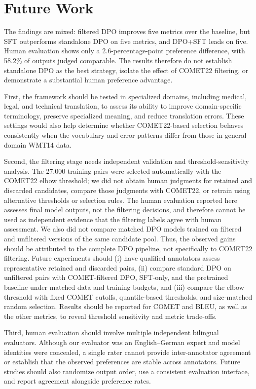 \documentclass[conference]{IEEEtran}
\begin{document}
\section{Future Work}\label{sec:future}
The findings are mixed: filtered DPO improves five metrics over the baseline, but SFT outperforms standalone DPO on five metrics, and DPO+SFT leads on five. Human evaluation shows only a 2.6-percentage-point preference difference, with 58.2\% of outputs judged comparable. The results therefore do not establish standalone DPO as the best strategy, isolate the effect of COMET22 filtering, or demonstrate a substantial human preference advantage.

First, the framework should be tested in specialized domains, including medical, legal, and technical translation, to assess its ability to improve domain-specific terminology, preserve specialized meaning, and reduce translation errors. These settings would also help determine whether COMET22-based selection behaves consistently when the vocabulary and error patterns differ from those in general-domain WMT14 data.

Second, the filtering stage needs independent validation and threshold-sensitivity analysis. The 27,000 training pairs were selected automatically with the COMET22 elbow threshold; we did not obtain human judgments for retained and discarded candidates, compare those judgments with COMET22, or retrain using alternative thresholds or selection rules. The human evaluation reported here assesses final model outputs, not the filtering decisions, and therefore cannot be used as independent evidence that the filtering labels agree with human assessment. We also did not compare matched DPO models trained on filtered and unfiltered versions of the same candidate pool. Thus, the observed gains should be attributed to the complete DPO pipeline, not specifically to COMET22 filtering. Future experiments should (i) have qualified annotators assess representative retained and discarded pairs, (ii) compare standard DPO on unfiltered pairs with COMET-filtered DPO, SFT-only, and the pretrained baseline under matched data and training budgets, and (iii) compare the elbow threshold with fixed COMET cutoffs, quantile-based thresholds, and size-matched random selection. Results should be reported for COMET and BLEU, as well as the other metrics, to reveal threshold sensitivity and metric trade-offs.

Third, human evaluation should involve multiple independent bilingual evaluators. Although our evaluator was an English--German expert and model identities were concealed, a single rater cannot provide inter-annotator agreement or establish that the observed preferences are stable across annotators. Future studies should also randomize output order, use a consistent evaluation interface, and report agreement alongside preference rates.
\end{document}
